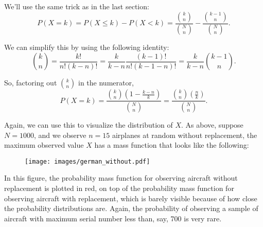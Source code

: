 \documentclass[11pt]{article}
\begin{document}
We'll use the same trick as in the last section:
$$
    P(X = k) = P(X \leq k) - P(X < k) = \frac{{k \choose n}}{{N \choose n}} - \frac{{k-1 \choose n}}{{N \choose n}}.
$$

We can simplify this by using the following identity:
$$
    {k \choose n} = \frac{k!}{n!(k-n)!} = \frac{k}{k-n}\frac{(k-1)!}{n!(k-1-n)!} = \frac{k}{k-n} {k-1 \choose n}.
$$

So, factoring out ${k \choose n}$ in the numerator,
$$
P(X = k) = \frac{{k \choose n}\left(1 - \frac{k-n}{k}\right)}{{N \choose n}} = \frac{{k \choose n}\left(\frac{n}{k}\right)}{{N \choose n}}.
$$

Again, we can use this to visualize the distribution of $X$. As above, suppose $N = 1000$, and we observe $n = 15$ airplanes at random without replacement, the maximum observed value $X$ has a
mass function that looks like the following:

\begin{figure}[h!]
    \centering
    \texttt{[image: images/german\_without.pdf]}
\end{figure}

In this figure, the probability mass function for observing aircraft without replacement is plotted in red, on top of the probability mass function for observing aircraft with replacement, which is barely visible because of how close the probability distributions are. Again, the probability of observing a sample of aircraft with maximum serial number less than, say, 700 is very rare.
\end{document}

